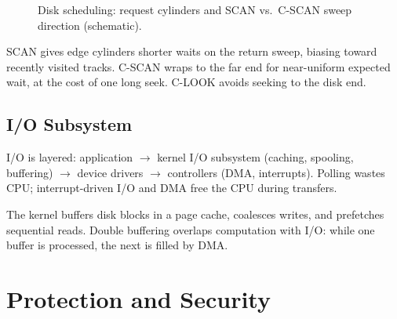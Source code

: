 \begin{figure}[h!]
\centering
{}
\caption{Disk scheduling: request cylinders and SCAN vs.\ C-SCAN sweep direction (schematic).}
\label{fig:disk-sched}
\end{figure}

\begin{example}
SCAN gives edge cylinders shorter waits on the return sweep, biasing toward
recently visited tracks. C-SCAN wraps to the far end for near-uniform expected
wait, at the cost of one long seek. C-LOOK avoids seeking to the disk end.
\end{example}

\subsection{I/O Subsystem}
I/O is layered: application $\to$ kernel I/O subsystem (caching, spooling,
buffering) $\to$ device drivers $\to$ controllers (DMA, interrupts). Polling
wastes CPU; interrupt-driven I/O and DMA free the CPU during transfers.

\begin{remark}
The kernel buffers disk blocks in a page cache, coalesces writes, and
prefetches sequential reads. Double buffering overlaps computation with I/O:
while one buffer is processed, the next is filled by DMA.
\end{remark}

\section{Protection and Security}
\label{sec:protection}

